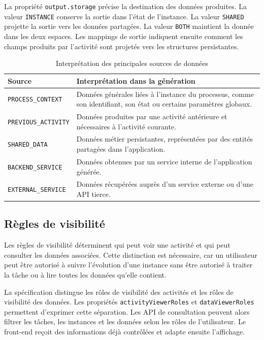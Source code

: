 La propriété \texttt{output.storage} précise la destination des données produites. La valeur \texttt{INSTANCE} conserve la sortie dans l'état de l'instance. La valeur \texttt{SHARED} projette la sortie vers les données partagées. La valeur \texttt{BOTH} maintient la donnée dans les deux espaces. Les mappings de sortie indiquent ensuite comment les champs produits par l'activité sont projetés vers les structures persistantes.

\begin{table}[H]
\centering
\small
\caption{Interprétation des principales sources de données}
\label{tab:chap3-sources-donnees}
\begin{tabular}{p{4.2cm}p{9.6cm}}
\hline
\textbf{Source} & \textbf{Interprétation dans la génération} \\
\hline
\texttt{PROCESS\_CONTEXT} & Données générales liées à l'instance du processus, comme son identifiant, son état ou certains paramètres globaux. \\
\texttt{PREVIOUS\_ACTIVITY} & Données produites par une activité antérieure et nécessaires à l'activité courante. \\
\texttt{SHARED\_DATA} & Données métier persistantes, représentées par des entités partagées dans l'application. \\
\texttt{BACKEND\_SERVICE} & Données obtenues par un service interne de l'application générée. \\
\texttt{EXTERNAL\_SERVICE} & Données récupérées auprès d'un service externe ou d'une API tierce. \\
\hline
\end{tabular}
\end{table}

\subsection{Règles de visibilité}

Les règles de visibilité déterminent qui peut voir une activité et qui peut consulter les données associées. Cette distinction est nécessaire, car un utilisateur peut être autorisé à suivre l'évolution d'une instance sans être autorisé à traiter la tâche ou à lire toutes les données qu'elle contient.

La spécification distingue les rôles de visibilité des activités et les rôles de visibilité des données. Les propriétés \texttt{activityViewerRoles} et \texttt{dataViewerRoles} permettent d'exprimer cette séparation. Les API de consultation peuvent alors filtrer les tâches, les instances et les données selon les rôles de l'utilisateur. Le front-end reçoit des informations déjà contrôlées et adapte ensuite l'affichage.

